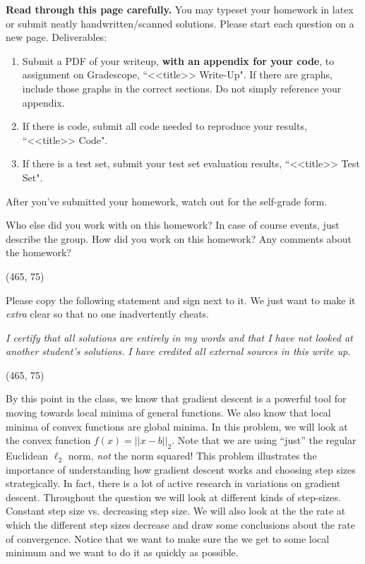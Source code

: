 \documentclass[preview]{standalone}
\begin{document}
\fontsize{12}{15}\selectfont


\textbf{Read through this page carefully.} You may typeset your homework in latex or submit neatly handwritten/scanned solutions. Please start each question on a new page. Deliverables:

\begin{enumerate}
  \item Submit a PDF of your writeup, \textbf{with an appendix for your code}, to assignment on Gradescope, ``<<title>> Write-Up". If there are graphs, include those graphs in the correct sections. Do not simply reference your appendix.
  \item If there is code, submit all code needed to reproduce your results, ``<<title>> Code".
  \item If there is a test set, submit your test set evaluation results, ``<<title>> Test Set".
\end{enumerate}

After you've submitted your homework, watch out for the self-grade form.

\begin{Parts}

\Part Who else did you work with on this homework? In case of course events, just describe the group. How did you work on this homework? Any comments about the homework?

\vspace{15pt}
\framebox(465, 75){}

\Part Please copy the following statement and sign next to it. We just want to make it \textit{extra} clear so that no one inadvertently cheats.

\textit{I certify that all solutions are entirely in my words and that I have not looked at another student's solutions. I have credited all external sources in this write up.}

\vspace{15pt}
\framebox(465, 75){}

\end{Parts}

\pagebreak



By this point in the class, we know that gradient descent is a powerful tool for
moving towards local minima of general functions. We also know that local minima
of convex functions are global minima. In this problem, we will look at the
convex function $f(x) = ||x-b||_2$. Note that we are using ``just'' the regular
Euclidean $\ell_2$ norm, \emph{not} the norm squared! This problem illustrates
the importance of understanding how gradient descent works and choosing step
sizes strategically. In fact, there is a lot of active research in variations on
gradient descent.
Throughout the question we will look at different kinds of step-sizes.
Constant step size vs. decreasing step size. We will also look at the the rate at
which the different step sizes decrease and draw some conclusions about the
rate of convergence.
Notice that we want to make sure the we get to some local minimum and we
want to do it as quickly as possible.
\end{document}
